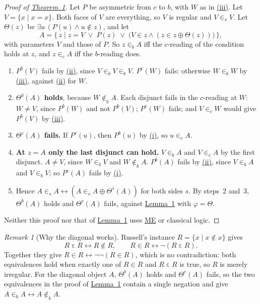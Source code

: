 \documentclass[11pt,a4paper]{article}
\theoremstyle{definition}
\theoremstyle{remark}
\newtheorem*{remark*}{Remark}
\newcommand{\eps}{\varepsilon}
\newcommand{\os}{\bar s}
\newcommand{\ME}{\textup{ME}}
\begin{document}
\begin{proof}[Proof of {\hyperref[thm:1]{Theorem~1}}]
Let $P$ be asymmetric from $c$ to $b$, with $W$ as in {\hyperref[cond:iii]{(iii)}}. Let $V = \{x \mid x = x\}$. Both faces of $V$ are everything, so $V$ is regular and $V \in_s V$. Let $\Theta(z)$ be $\exists u\,(P(u) \wedge u \notin z)$, and let
\[
  A = \{\, z \mid z = V \;\vee\; P(z) \;\vee\; \bigl(V \in z \wedge (z \in z \oplus \Theta(z))\bigr) \,\},
\]
with parameters $V$ and those of $P$. So $z \in_b A$ iff the $c$-reading of the condition holds at $z$, and $z \in_c A$ iff the $b$-reading does.
\begin{enumerate}[label=\arabic*.]
\item $P^b(V)$ fails by {\hyperref[cond:ii]{(ii)}}, since $V \in_b V \in_b V$. $P^c(W)$ fails: otherwise $W \in_b W$ by {\hyperref[cond:iii]{(iii)}}, against {\hyperref[cond:ii]{(ii)}} for $W$.
\item \textbf{\boldmath $\Theta^b(A)$ holds}, because $W \notin_b A$. Each disjunct fails in the $c$-reading at $W$: $W \neq V$, since $P^b(W)$ and not $P^b(V)$; $P^c(W)$ fails; and $V \in_c W$ would give $P^b(V)$ by {\hyperref[cond:iii]{(iii)}}.
\item \textbf{\boldmath $\Theta^c(A)$ fails.} If $P^c(u)$, then $P^b(u)$ by {\hyperref[cond:i]{(i)}}, so $u \in_c A$.
\item \textbf{\boldmath At $z = A$ only the last disjunct can hold.} $V \in_b A$ and $V \in_c A$ by the first disjunct. $A \neq V$, since $W \in_b V$ and $W \notin_b A$. $P^b(A)$ fails by {\hyperref[cond:ii]{(ii)}}, since $V \in_b A$ and $V \in_b V$; so $P^c(A)$ fails by {\hyperref[cond:i]{(i)}}.
\item Hence $A \in_s A \leftrightarrow (A \in_{\os} A \oplus \Theta^{\os}(A))$ for both sides $s$. By steps~2 and~3, $\Theta^b(A)$ holds and $\Theta^c(A)$ fails, against {\hyperref[lem:1]{Lemma~1}} with $\varphi = \Theta$.
\end{enumerate}
Neither this proof nor that of {\hyperref[lem:1]{Lemma~1}} uses {\hyperref[ax:ME]{\ME}}{} or classical logic.
\end{proof}

\begin{remark*}[Why the diagonal works]
Russell's instance $R = \{x \mid x \notin x\}$ gives
\[
  R \mathrel{\eps} R \leftrightarrow R \notin R, \qquad R \in R \leftrightarrow \neg(R \mathrel{\eps} R).
\]
Together they give $R \in R \leftrightarrow \neg\neg(R \in R)$, which is no contradiction: both equivalences hold when exactly one of $R \in R$ and $R \mathrel{\eps} R$ is true, so $R$ is merely irregular. For the diagonal object $A$, $\Theta^b(A)$ holds and $\Theta^c(A)$ fails, so the two equivalences in the proof of {\hyperref[lem:1]{Lemma~1}} contain a single negation and give $A \in_b A \leftrightarrow A \notin_b A$.
\end{remark*}
\end{document}
